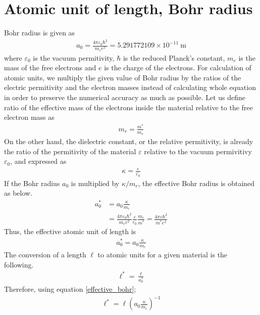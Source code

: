 \documentclass[a4paper,12pt]{report}
\begin{document}
\section*{Atomic unit of length, Bohr radius} \label{bohr}
Bohr radius is given as
\begin{align}
    a_{0} = \frac{4 \pi \varepsilon_{0} \hbar^{2}}{m_{e} e^{2}}
          = 5.291772109 \times 10^{-11} \ \textrm{m}
\end{align}
where $\varepsilon_{0}$ is the vacuum permitivity, $\hbar$ is the reduced
Planck's constant, $m_{e}$ is the mass of the free electrons and $e$ is the
charge of the electrons. For calculation of atomic units, we multiply the
given value of Bohr radius by the ratios of the electric permitivity and the
electron masses instead of calculating whole equation in order to preserve the
numerical accuracy as much as possible. Let us define ratio of the effective
mass of the electrons inside the material relative to the free electron mass as
\begin{align}
    m_{r} = \frac{m^{*}}{m_{e}}
\end{align}
On the other hand, the dielectric constant, or the relative permitivity, is
already the ratio of the permitivity of the material $\varepsilon$ relative to
the vacuum permivitivy $\varepsilon_{0}$, and expressed as
\begin{align}
    \kappa = \frac{\varepsilon}{\varepsilon_{0}}
\end{align}
If the Bohr radius $a_{0}$ is multiplied by $\kappa/m_{r}$, the effective Bohr
radius is obtained as below.
\begin{align}
    a^{*}_{0} &= a_{0} \frac{\kappa}{m_{r}} \nonumber \\
              &= \frac{4 \pi \varepsilon_{0} \hbar^{2}}{m_{e} e^{2}}
              \frac{\varepsilon}{\varepsilon_{0}} \frac{m_{e}}{m^{*}}
              = \frac{4 \pi \varepsilon \hbar^{2}}{m^{*} e^{2}}
\end{align}
Thus, the effective atomic unit of length is 
\begin{align} \label{effective_bohr}
    \boxed{ a^{*}_{0} = a_{0} \frac{\kappa}{m_{r}} }
\end{align} 
The conversion of a length $\ell$ to atomic units for a given material is
the following.
\begin{align}
    \boxed{ \ell^{*} = \frac{\ell}{a^{*}_{0}} }
\end{align} 
Therefore, using equation \ref{effective_bohr};
\begin{align}
    \boxed{ \ell^{*} = \ell \left( a_{0} \frac{\kappa}{m_{r}} \right) ^{-1}}
\end{align} 
\end{document}
